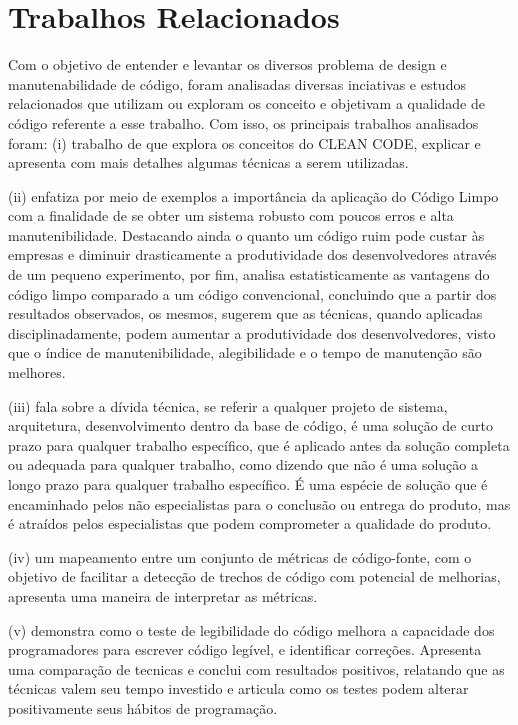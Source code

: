 \documentclass[12pt]{article}
\begin{document}
\part{Trabalhos Relacionados} \label{sec:trabalhosrelacionados}

Com o objetivo de entender e levantar os diversos problema de design e manutenabilidade de código, foram analisadas diversas inciativas e estudos relacionados que utilizam ou exploram os conceito e objetivam a qualidade de código referente a esse trabalho.
Com isso, os principais trabalhos analisados foram: (i) trabalho de \cite{TR_CLEAN_CODE_INTRODUCAO} que explora os conceitos do CLEAN CODE, explicar e apresenta com mais detalhes algumas técnicas a serem utilizadas.

 (ii) \cite{TR_CLEAN_CODE_IMPORTANCIA} enfatiza por meio de exemplos a importância da aplicação do
Código Limpo com a finalidade de se obter um sistema robusto com poucos erros e alta manutenibilidade. Destacando ainda o quanto um código ruim pode custar às empresas e diminuir drasticamente a produtividade dos desenvolvedores através de um pequeno experimento, por fim, analisa estatisticamente as vantagens do código limpo comparado a um código convencional, concluindo que a partir dos resultados observados, os mesmos, sugerem que as técnicas, quando aplicadas disciplinadamente, podem aumentar a produtividade dos desenvolvedores, visto que o índice de manutenibilidade, alegibilidade e o tempo de manutenção são melhores.
 
 (iii) \cite{TR_QC_TECHNICAL_DEBT} fala sobre a dívida técnica, se referir a qualquer projeto de sistema, arquitetura, desenvolvimento dentro da base de código, é uma solução de curto prazo para qualquer trabalho específico, que é aplicado antes da solução completa ou adequada para
qualquer trabalho, como dizendo que não é uma solução a longo prazo para qualquer trabalho específico. É uma espécie de solução que é encaminhado pelos não especialistas para o conclusão ou entrega do produto, mas é atraídos pelos especialistas que podem comprometer a qualidade do produto.

 (iv) \cite{TR_CLEAN_CODE_METRICA} um mapeamento entre um conjunto de métricas de código-fonte, com o objetivo de facilitar a detecção de trechos de código com potencial de melhorias, apresenta uma maneira de interpretar as métricas.

 (v) \cite{CODE_READABILITY_TESTING_STUDY} demonstra
como o teste de legibilidade do código melhora a capacidade dos programadores
para escrever código legível, e identificar correções. Apresenta uma comparação de tecnicas e conclui com resultados positivos, relatando que as técnicas valem seu tempo investido e articula como os testes podem alterar positivamente seus hábitos de programação.
 
\end{document}
